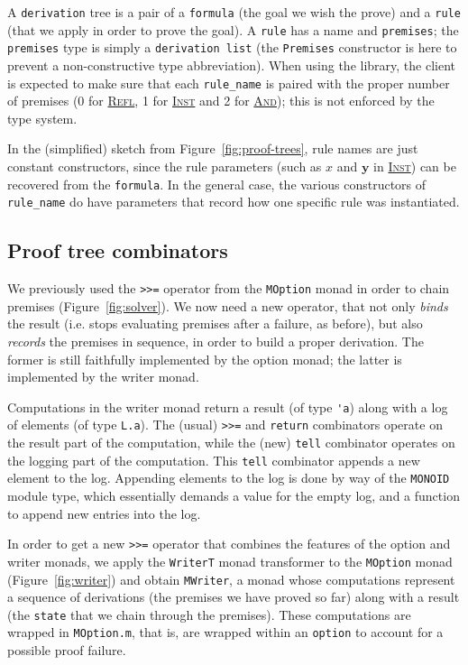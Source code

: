 \documentclass{easychair}
\def\li{\lstinline}
\let\TirName\textsc
\renewcommand{\DefTirName}[1]{\hyperlink{#1}{\TirName {#1}}}
\let\Rule\DefTirName
\newcommand{\fref}[1]{Figure~\ref{fig:#1}}
\newcommand{\f}[1]{\ensuremath{\mathbf{#1}}} %
\begin{document}
A \li+derivation+ tree is a pair of a \li+formula+ (the goal we wish the prove)
and a \li+rule+ (that we apply in order to prove the goal). A \li+rule+ has a name
and \li+premises+; the \li+premises+ type is simply a \li+derivation list+ (the
\li+Premises+ constructor is here to prevent a non-constructive type
abbreviation). When using the library, the client is expected to make sure
that each \li+rule_name+ is paired with the proper
number of premises (0 for \Rule{Refl}, 1 for
\Rule{Inst} and 2 for \Rule{And}); this is not enforced by the type system.

In the (simplified) sketch from \fref{proof-trees}, rule names are just constant
constructors, since the rule parameters (such as $x$ and $\f y$ in \Rule{Inst})
can be recovered from the \li+formula+. In the general case, the various
constructors of \li+rule_name+ do have parameters that record how one specific
rule was instantiated.

\subsection{Proof tree combinators}

We previously used the \li+>>=+ operator from the \li+MOption+ monad in order to
chain premises (\fref{solver}). We now need a new operator, that not only
\emph{binds} the result (i.e. stops evaluating premises after a failure, as
before), but also \emph{records} the premises in sequence, in order to build a
proper derivation. The former is still faithfully implemented by the option
monad; the latter is implemented by the writer monad.

Computations in the writer monad return a result (of type \li+'a+) along with a log of
elements (of type \li+L.a+). The (usual) \li+>>=+ and \li+return+ combinators operate on
the result part of the computation, while the (new) \li+tell+ combinator
operates on the logging part of the computation. This \li+tell+ combinator
appends a new element to the log. Appending elements to the log is done by way of the \li+MONOID+
module type, which essentially demands a value for the empty log, and a function to
append new entries into the log.

In order to get a new \li+>>=+ operator that combines the features of
the option and writer monads, we apply the \li+WriterT+ monad transformer to the
\li+MOption+ monad (\fref{writer}) and obtain \li+MWriter+, a monad whose
computations represent a sequence of derivations (the premises we have proved so far)
along with a result (the \li+state+ that we chain through the premises). These
computations are wrapped in \li+MOption.m+, that is, are wrapped within an
\li+option+ to account for a possible proof failure.
\end{document}

